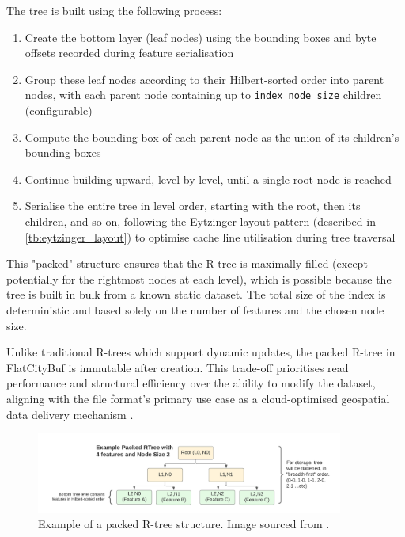 The tree is built using the following process:

\begin{enumerate}
  \item Create the bottom layer (leaf nodes) using the bounding boxes and byte offsets recorded during feature serialisation
  \item Group these leaf nodes according to their Hilbert-sorted order into parent nodes, with each parent node containing up to \texttt{index\_node\_size} children (configurable)
  \item Compute the bounding box of each parent node as the union of its children's bounding boxes
  \item Continue building upward, level by level, until a single root node is reached
  \item Serialise the entire tree in level order, starting with the root, then its children, and so on, following the Eytzinger layout pattern (described in \autoref{tb:eytzinger_layout}) to optimise cache line utilisation during tree traversal
\end{enumerate}

This "packed" structure ensures that the R-tree is maximally filled (except potentially for the rightmost nodes at each level), which is possible because the tree is built in bulk from a known static dataset. The total size of the index is deterministic and based solely on the number of features and the chosen node size.

Unlike traditional R-trees which support dynamic updates, the packed R-tree in FlatCityBuf is immutable after creation. This trade-off prioritises read performance and structural efficiency over the ability to modify the dataset, aligning with the file format's primary use case as a cloud-optimised geospatial data delivery mechanism \citep{horance_2022_overview}.

\begin{figure}[ht]
  \centering
  \includegraphics[width=0.9\textwidth]{./figs/methodology/packed_rtree.png}
  \caption{Example of a packed R-tree structure. Image sourced from \cite{horance_2022_overview}.}
  \label{fig:packed_rtree}
\end{figure}
